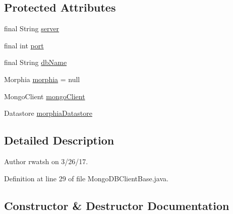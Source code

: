 \subsection*{Protected Attributes}
\begin{DoxyCompactItemize}
\item 
final String \hyperlink{classedu_1_1sjsu_1_1amigo_1_1db_1_1common_1_1mongodb_1_1_mongo_d_b_client_base_acc3f5ff73b7e3ffe9af475a23c208119}{server}
\item 
final int \hyperlink{classedu_1_1sjsu_1_1amigo_1_1db_1_1common_1_1mongodb_1_1_mongo_d_b_client_base_ae4ea19c2e926899224780fd86e6f2e64}{port}
\item 
final String \hyperlink{classedu_1_1sjsu_1_1amigo_1_1db_1_1common_1_1mongodb_1_1_mongo_d_b_client_base_a53368e64a0b78deaf8577c6fa9010cdb}{db\+Name}
\item 
Morphia \hyperlink{classedu_1_1sjsu_1_1amigo_1_1db_1_1common_1_1mongodb_1_1_mongo_d_b_client_base_a548c8dfccbd54f5bf84f35f793515025}{morphia} = null
\item 
Mongo\+Client \hyperlink{classedu_1_1sjsu_1_1amigo_1_1db_1_1common_1_1mongodb_1_1_mongo_d_b_client_base_a8d080cec390fe2d50f8958151e2efadf}{mongo\+Client}
\item 
Datastore \hyperlink{classedu_1_1sjsu_1_1amigo_1_1db_1_1common_1_1mongodb_1_1_mongo_d_b_client_base_aa784c335d76963fc507593aca58e1b3a}{morphia\+Datastore}
\end{DoxyCompactItemize}


\subsection{Detailed Description}
\begin{DoxyAuthor}{Author}
rwatsh on 3/26/17. 
\end{DoxyAuthor}


Definition at line 29 of file Mongo\+D\+B\+Client\+Base.\+java.



\subsection{Constructor \& Destructor Documentation}
\mbox{\label{classedu_1_1sjsu_1_1amigo_1_1db_1_1common_1_1mongodb_1_1_mongo_d_b_client_base_a2f238f9220270db8d0b0cb90be2028bd}} 
